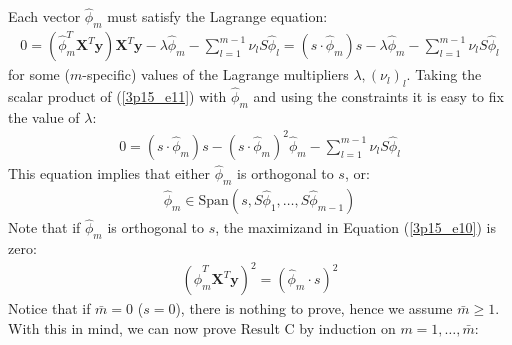 \noindent Each vector $\hat{\phi}_m$ must satisfy the Lagrange equation:
\begin{eqnarray} \label{3p15_e11}
	0 = \left( \hat{\phi}_m^T \mathbf{X}^T \mathbf{y} \right) \mathbf{X}^T \mathbf{y} - \lambda \hat{\phi}_m - \sum_{l = 1}^{m - 1} \nu_l S \hat{\phi}_l = (s \cdot \hat{\phi}_m) s - \lambda \hat{\phi}_m - \sum_{l = 1}^{m - 1} \nu_l S \hat{\phi}_l
\end{eqnarray}
for some ($m$-specific) values of the Lagrange multipliers $\lambda, (\nu_l)_l$. Taking the scalar
product of (\ref{3p15_e11}) with $\hat{\phi}_m$ and using the constraints it is easy to fix the value
of $\lambda$:
\begin{eqnarray*}
0 = (s \cdot \hat{\phi}_m) s -  (s \cdot \hat{\phi}_m)^2 \hat{\phi}_m - \sum_{l = 1}^{m - 1} \nu_l S \hat{\phi}_l
\end{eqnarray*}
This equation implies that either $\hat{\phi}_m$ is orthogonal to $s$, or:
\begin{eqnarray} \label{3p15_span}
\hat{\phi}_m \in \textrm{Span} \left( s, S \hat{\phi}_1, \ldots, S \hat{\phi}_{m - 1}  \right)
\end{eqnarray}
Note that if $\hat{\phi}_m$ is orthogonal to $s$, the maximizand in Equation (\ref{3p15_e10}) is
zero:
\begin{eqnarray*}
\left( \hat{\phi}_m^T \mathbf{X}^T \mathbf{y} \right)^2 = \left(\hat{\phi}_m \cdot s  \right)^2
\end{eqnarray*}
Notice that if $\bar{m} = 0$ ($s = 0$), there is nothing to prove, hence we assume $\bar{m} \geq 1$.
With this in mind, we can now prove Result C by induction on $m = 1, \ldots, \bar{m}$:
